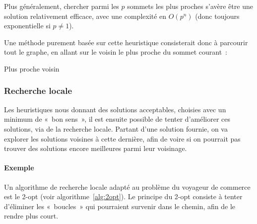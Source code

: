     Plus généralement, chercher parmi les $p$ sommets les plus proches s'avère
    être une solution relativement efficace, avec une complexité en $O(p^n)$
    (donc toujours exponentielle si $p \neq 1$).

    Une méthode purement basée sur cette heuristique consisterait donc à parcourir
    tout le graphe, en allant sur le voisin le plus proche du sommet courant~:

    \begin{algorithm}
      \label{alg:voisin}
      \caption{Plus proche voisin}
    \end{algorithm}

  \subsubsection{Recherche locale}
    Les heuristiques nous donnant des solutions acceptables, choisies avec un
    minimum de «~bon sens~», il est ensuite possible de tenter d'améliorer
    ces solutions, via de la recherche locale.
    Partant d'une solution fournie, on va explorer les solutions voisines
    à cette dernière, afin de voire si on pourrait pas trouver des solutions
    encore meilleures parmi leur voisinage.

    \paragraph{Exemple} Un algorithme de recherche locale adapté au problème
    du voyageur de commerce est le 2-opt (voir algorithme~\ref{alg:2opt}).
    Le principe du 2-opt consiste à tenter d'éliminer les «~boucles~» qui
    pourraient survenir dans le chemin, afin de le rendre plus court.

